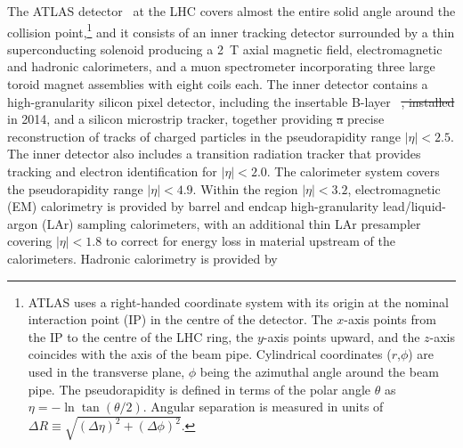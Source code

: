 \documentclass[PAPER, coverpage, atlasdraft=true, texlive=2016, UKenglish]{\ATLASLATEXPATH atlasdoc}
\providecommand{\DIFadd}[1]{{\protect\color{blue}\uwave{#1}}} %
\providecommand{\DIFdel}[1]{{\protect\color{red}\sout{#1}}}                      %
\providecommand{\DIFaddbegin}{} %
\providecommand{\DIFaddend}{} %
\providecommand{\DIFdelbegin}{} %
\providecommand{\DIFdelend}{} %
\begin{document}
The ATLAS detector~\cite{PERF-2007-01} at the LHC covers almost the entire solid angle around the collision point,\footnote{ATLAS 
uses a right-handed coordinate system with its origin at the nominal interaction point (IP) in the 
centre of the detector.  
The $x$-axis points from
the IP to the centre of the LHC ring, %
the $y$-axis points upward,
and the $z$-axis coincides with the axis of the beam pipe.
Cylindrical coordinates ($r$,$\phi$) are used 
in the transverse plane, $\phi$ being the azimuthal angle around the beam pipe. The pseudorapidity is defined in 
terms of the polar angle $\theta$ as $\eta = - \ln \tan(\theta/2)$.
Angular separation is measured in units of $\Delta R\equiv \sqrt{(\Delta\eta)^2+(\Delta\phi)^2}$.} and it consists of an inner tracking detector surrounded by a thin superconducting solenoid producing a
2~T axial magnetic field, electromagnetic and hadronic calorimeters, and a muon spectrometer incorporating three large toroid magnet assemblies with eight coils each. The inner detector contains a high-granularity silicon pixel detector, including the %
insertable B-layer~\cite{IBL1,IBL2,Abbott:2018ikt} \DIFdelbegin \DIFdel{, installed }\DIFdelend \DIFaddbegin \DIFadd{added as a new innermost layer }\DIFaddend in 2014, and a silicon microstrip tracker, together providing \DIFdelbegin \DIFdel{a }\DIFdelend precise reconstruction of tracks of charged particles in the pseudorapidity range $|\eta|<2.5$.
The inner detector also includes a transition radiation tracker that provides tracking and electron identification for $|\eta|<2.0$.
The calorimeter system covers the pseudorapidity range $|\eta| < 4.9$. Within the region $|\eta|< 3.2$, electromagnetic (EM) calorimetry is provided by barrel and endcap high-granularity lead/liquid-argon (LAr) sampling calorimeters, with an additional thin LAr presampler covering $|\eta| < 1.8$ to correct for energy loss in material upstream of the calorimeters. Hadronic calorimetry is provided by %
\end{document}
